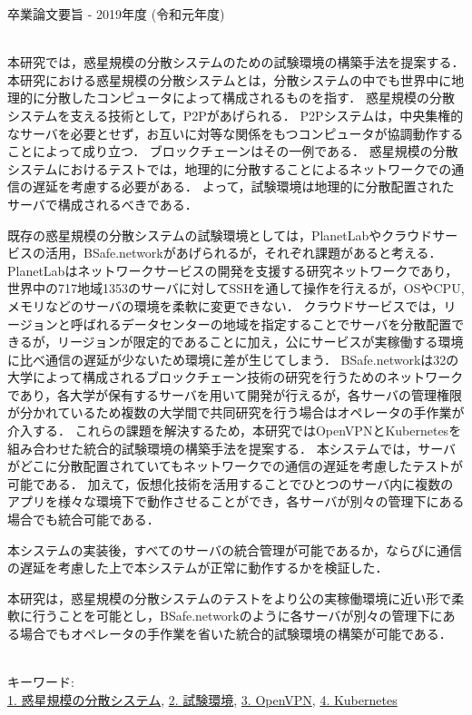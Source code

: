 卒業論文要旨 - 2019年度 (令和元年度)
\begin{center}
\begin{large}
\end{large}
\end{center}

~ \\
本研究では，惑星規模の分散システムのための試験環境の構築手法を提案する．
本研究における惑星規模の分散システムとは，分散システムの中でも世界中に地理的に分散したコンピュータによって構成されるものを指す．
惑星規模の分散システムを支える技術として，P2Pがあげられる．
P2Pシステムは，中央集権的なサーバを必要とせず，お互いに対等な関係をもつコンピュータが協調動作することによって成り立つ．
ブロックチェーンはその一例である．
惑星規模の分散システムにおけるテストでは，地理的に分散することによるネットワークでの通信の遅延を考慮する必要がある．
よって，試験環境は地理的に分散配置されたサーバで構成されるべきである．

既存の惑星規模の分散システムの試験環境としては，PlanetLabやクラウドサービスの活用，BSafe.networkがあげられるが，それぞれ課題があると考える．
PlanetLabはネットワークサービスの開発を支援する研究ネットワークであり，世界中の717地域1353のサーバに対してSSHを通して操作を行えるが，OSやCPU,メモリなどのサーバの環境を柔軟に変更できない．
クラウドサービスでは，リージョンと呼ばれるデータセンターの地域を指定することでサーバを分散配置できるが，リージョンが限定的であることに加え，公にサービスが実稼働する環境に比べ通信の遅延が少ないため環境に差が生じてしまう．
BSafe.networkは32の大学によって構成されるブロックチェーン技術の研究を行うためのネットワークであり，各大学が保有するサーバを用いて開発が行えるが，各サーバの管理権限が分かれているため複数の大学間で共同研究を行う場合はオペレータの手作業が介入する．
これらの課題を解決するため，本研究ではOpenVPNとKubernetesを組み合わせた統合的試験環境の構築手法を提案する．
本システムでは，サーバがどこに分散配置されていてもネットワークでの通信の遅延を考慮したテストが可能である．
加えて，仮想化技術を活用することでひとつのサーバ内に複数のアプリを様々な環境下で動作させることができ，各サーバが別々の管理下にある場合でも統合可能である．

本システムの実装後，すべてのサーバの統合管理が可能であるか，ならびに通信の遅延を考慮した上で本システムが正常に動作するかを検証した．

本研究は，惑星規模の分散システムのテストをより公の実稼働環境に近い形で柔軟に行うことを可能とし，BSafe.networkのように各サーバが別々の管理下にある場合でもオペレータの手作業を省いた統合的試験環境の構築が可能である．

~ \\
キーワード:\\
\underline{1. 惑星規模の分散システム},
\underline{2. 試験環境},
\underline{3. OpenVPN},
\underline{4. Kubernetes}

\begin{flushright}
\dept \\
\author
\end{flushright}
